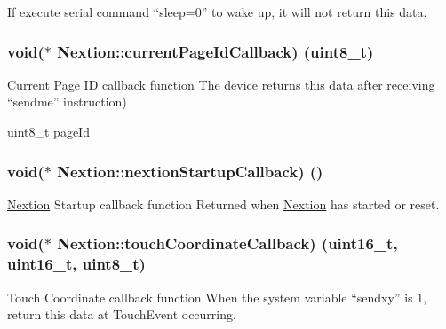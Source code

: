 If execute serial command “sleep=0” to wake up, it will not return this data. \hypertarget{group___core_a_p_i_gaebfa8d976f00a1c4c68163885525954f}{}
\subsubsection[{current\+Page\+Id\+Callback}]{\setlength{\rightskip}{0pt plus 5cm}void($\ast$ Nextion\+::current\+Page\+Id\+Callback) (uint8\+\_\+t)}\label{group___core_a_p_i_gaebfa8d976f00a1c4c68163885525954f}


Current Page I\+D callback function The device returns this data after receiving “sendme” instruction) 

uint8\+\_\+t page\+Id \hypertarget{group___core_a_p_i_ga3d753a2fb4365352720352570b890c44}{}
\subsubsection[{nextion\+Startup\+Callback}]{\setlength{\rightskip}{0pt plus 5cm}void($\ast$ Nextion\+::nextion\+Startup\+Callback) ()}\label{group___core_a_p_i_ga3d753a2fb4365352720352570b890c44}


\hyperlink{class_nextion}{Nextion} Startup callback function Returned when \hyperlink{class_nextion}{Nextion} has started or reset. 

\hypertarget{group___core_a_p_i_ga951cde4126a1f70f7294d6126b096901}{}
\subsubsection[{touch\+Coordinate\+Callback}]{\setlength{\rightskip}{0pt plus 5cm}void($\ast$ Nextion\+::touch\+Coordinate\+Callback) (uint16\+\_\+t, uint16\+\_\+t, uint8\+\_\+t)}\label{group___core_a_p_i_ga951cde4126a1f70f7294d6126b096901}


Touch Coordinate callback function When the system variable “sendxy” is 1, return this data at Touch\+Event occurring. 

